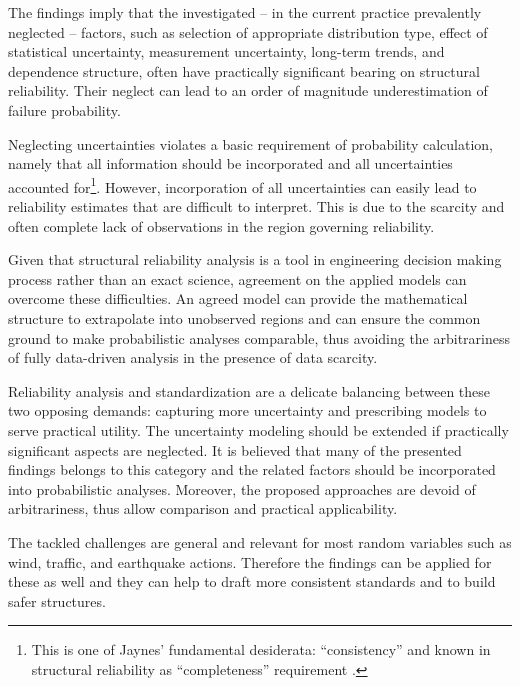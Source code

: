 The findings imply that the investigated -- in the current practice prevalently neglected -- factors, such as selection of appropriate distribution type, effect of statistical uncertainty, measurement uncertainty, long-term trends, and dependence structure, often have practically significant bearing on structural reliability. Their neglect can lead to an order of magnitude underestimation of failure probability.

Neglecting uncertainties violates a basic requirement of probability calculation, namely that all information should be incorporated and all uncertainties accounted for\footnote{This is one of Jaynes' fundamental desiderata: ``consistency'' \citep{Jaynes2003} and known in structural reliability as ``completeness'' requirement \citep{Kiureghian1989}.}. However, incorporation of all uncertainties can easily lead to reliability estimates that are difficult to interpret. This is due to the scarcity and often complete lack of observations in the region governing reliability. %

Given that structural reliability analysis is a tool in engineering decision making process rather than an exact science, agreement on the applied models can overcome these difficulties. An agreed model can provide the mathematical structure to extrapolate into unobserved regions and can ensure the common ground to make probabilistic analyses comparable, thus avoiding the arbitrariness of fully data-driven analysis in the presence of data scarcity. 

Reliability analysis and standardization are a delicate balancing between these two opposing demands: capturing more uncertainty and prescribing models to serve practical utility. The uncertainty modeling should be extended if practically significant aspects are neglected. %
It is believed that many of the presented findings belongs to this category and the related factors should be incorporated into probabilistic analyses. Moreover, the proposed approaches are devoid of arbitrariness, thus allow comparison and practical applicability.

The tackled challenges are general and relevant for most random variables such as wind, traffic, and earthquake actions. Therefore the findings can be applied for these as well and they can help to draft more consistent standards and to build safer structures.





